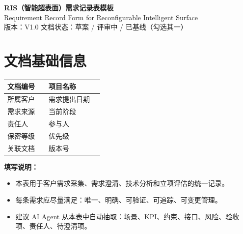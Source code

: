 \documentclass[12pt,a4paper]{ctexart}
\begin{document}
\begin{center}
    {\LARGE \bfseries RIS（智能超表面）需求记录表模板}\\[0.5em]
    {\large Requirement Record Form for Reconfigurable Intelligent Surface}\\[0.8em]
    {\small 版本：V1.0 \quad 文档状态：草案 / 评审中 / 已基线（勾选其一）}
\end{center}

\vspace{0.6em}

\section{文档基础信息}

\begin{tabularx}{\textwidth}{|P{3.2cm}|Y|P{3.2cm}|Y|}
\hline
文档编号 & %
 & 项目名称 & %
 \\ \hline
所属客户 & %
 & 需求提出日期 & %
 \\ \hline
需求来源 & %
 & 当前阶段 & %
 \\ \hline
责任人 & %
 & 参与人 & %
 \\ \hline
保密等级 & %
 & 优先级 & %
 \\ \hline
关联文档 & %
 & 版本号 & %
 \\ \hline
\end{tabularx}

\vspace{0.8em}

\textbf{填写说明：}
\begin{itemize}[leftmargin=2em]
    \item 本表用于客户需求采集、需求澄清、技术分析和立项评估的统一记录。
    \item 每条需求应尽量满足：唯一、明确、可验证、可追踪、可变更管理。
    \item 建议 AI Agent 从本表中自动抽取：场景、KPI、约束、接口、风险、验收项、责任人、待澄清项。
\end{itemize}

\end{document}
